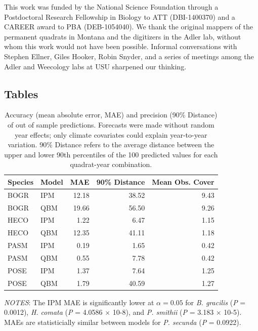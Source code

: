 \documentclass[12pt,]{article}
\begin{document}
This work was funded by the National Science Foundation through a
Postdoctoral Research Fellowship in Biology to ATT (DBI-1400370) and a
CAREER award to PBA (DEB-1054040). We thank the original mappers of the
permanent quadrats in Montana and the digitizers in the Adler lab,
without whom this work would not have been possible. Informal
conversations with Stephen Ellner, Giles Hooker, Robin Snyder, and a
series of meetings among the Adler and Weecology labs at USU sharpened
our thinking.

\pagebreak{}

\subsection{Tables}\label{tables}

\begin{table}[ht]
\centering
\caption{Accuracy (mean absolute error, MAE) and precision (90\% Distance) of out of sample predictions. Forecasts were made without random year effects; only climate covariates could explain year-to-year variation. 90\% Distance refers to the average distance between the upper and lower 90th percentiles of the 100 predicted values for each quadrat-year combination.} 
\begin{tabular}{llrrr}
  \hline
Species & Model & MAE & 90\% Distance & Mean Obs. Cover \\ 
  \hline
BOGR & IPM & 12.18 & 38.52 & 9.43 \\ 
  BOGR & QBM & 19.66 & 56.50 & 9.26 \\ 
  HECO & IPM & 1.22 & 6.47 & 1.15 \\ 
  HECO & QBM & 12.35 & 41.11 & 1.18 \\ 
  PASM & IPM & 0.19 & 1.65 & 0.42 \\ 
  PASM & QBM & 0.55 & 7.78 & 0.42 \\ 
  POSE & IPM & 1.37 & 7.64 & 1.25 \\ 
  POSE & QBM & 1.79 & 40.59 & 1.27 \\ 
   \hline
\end{tabular}
\end{table}

\emph{NOTES}: The IPM MAE is significantly lower at $\alpha=0.05$ for
\emph{B. gracilis} (\emph{P} = 0.0012), \emph{H. comata} (\emph{P} =
4.0586 × 10-8), and \emph{P. smithii} (\emph{P} = 3.183 × 10-5). MAEs
are statisticially similar between models for \emph{P. secunda}
(\emph{P} = 0.0922).

\pagebreak{}
\end{document}

